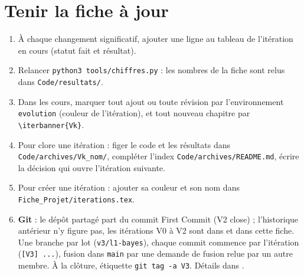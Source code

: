 \documentclass[11pt,a4paper]{report}
\begin{document}
\appendix
\chapter{Tenir la fiche à jour}
\begin{enumerate}
\item À chaque changement significatif, ajouter une ligne au tableau de l'itération en cours (statut \og fait\fg{} et résultat).
\item Relancer \texttt{python3 tools/chiffres.py} : les nombres de la fiche sont relus dans \texttt{Code/resultats/}.
\item Dans les cours, marquer tout ajout ou toute révision par l'environnement \texttt{evolution} (couleur de l'itération), et tout nouveau chapitre par \verb|\iterbanner{Vk}|.
\item Pour clore une itération : figer le code et les résultats dans \texttt{Code/archives/Vk\_nom/}, compléter l'index \texttt{Code/archives/README.md}, écrire la décision qui ouvre l'itération suivante.
\item Pour créer une itération : ajouter sa couleur et son nom dans \texttt{Fiche\_Projet/iterations.tex}.
\item \textbf{Git} : le dépôt partagé part du commit \og First Commit\fg{} (V2 close) ; l'historique antérieur n'y figure pas, les itérations V0 à V2 sont dans  et dans cette fiche. Une branche par lot (\texttt{v3/l1-bayes}), chaque commit commence par l'itération (\texttt{[V3] ...}), fusion dans \texttt{main} par une demande de fusion relue par un autre membre. À la clôture, étiquette \texttt{git tag -a V3}. Détails dans .
\end{enumerate}
\end{document}
